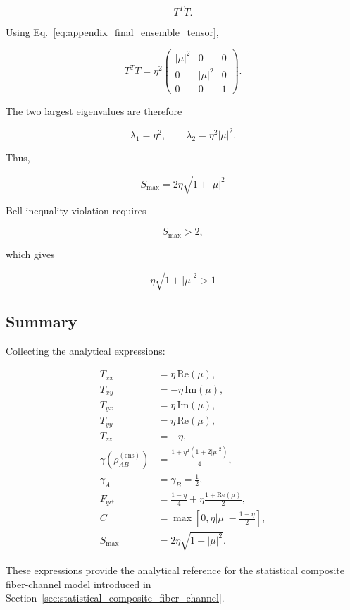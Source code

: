 \[
T^TT.
\]

\medskip

Using Eq.~\eqref{eq:appendix_final_ensemble_tensor},

\begin{equation}
T^TT
=
\eta^2
\begin{pmatrix}
|\mu|^2 & 0 & 0
\\
0 & |\mu|^2 & 0
\\
0 & 0 & 1
\end{pmatrix}.
\end{equation}

The two largest eigenvalues are therefore

\[
\lambda_1
=
\eta^2,
\qquad
\lambda_2
=
\eta^2|\mu|^2.
\]

Thus,

\begin{equation}
\boxed{
S_{\max}
=
2\eta
\sqrt{
1+|\mu|^2
}
}
\label{eq:appendix_ensemble_chsh}
\end{equation}

Bell-inequality violation requires

\begin{equation}
S_{\max}>2,
\end{equation}

which gives

\begin{equation}
\boxed{
\eta
\sqrt{
1+|\mu|^2
}
>
1
}
\label{eq:appendix_ensemble_chsh_threshold}
\end{equation}


\subsection*{Summary}

Collecting the analytical expressions:

\[
\boxed{
\begin{aligned}
T_{xx}
&=
\eta\,\mathrm{Re}(\mu),
\\
T_{xy}
&=
-\eta\,\mathrm{Im}(\mu),
\\
T_{yx}
&=
\eta\,\mathrm{Im}(\mu),
\\
T_{yy}
&=
\eta\,\mathrm{Re}(\mu),
\\
T_{zz}
&=
-\eta,
\\[2mm]
\gamma
\left(
\rho_{AB}^{(\mathrm{ens})}
\right)
&=
\frac{
1+\eta^2(1+2|\mu|^2)
}{4},
\\
\gamma_A
&=
\gamma_B
=
\frac12,
\\
F_{\Psi^+}
&=
\frac{1-\eta}{4}
+
\eta
\frac{
1+\mathrm{Re}(\mu)
}{2},
\\
C
&=
\max
\left[
0,
\eta|\mu|
-
\frac{1-\eta}{2}
\right],
\\
S_{\max}
&=
2\eta
\sqrt{
1+|\mu|^2
}.
\end{aligned}
}
\]

These expressions provide the analytical reference for the statistical composite fiber-channel model introduced in Section~\ref{sec:statistical_composite_fiber_channel}.